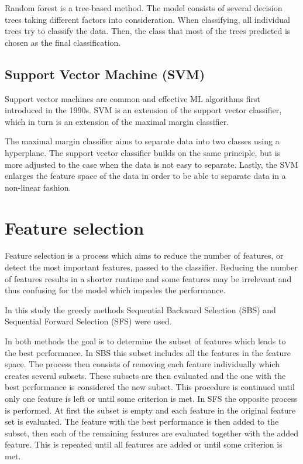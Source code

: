 \documentclass{kththesis}
\begin{document}
Random forest is a tree-based method. The model consists of several decision trees taking different factors into consideration. When classifying, all individual trees try to classify the data. Then, the class that most of the trees predicted is chosen as the final classification. \parencite{ibmrforest}


\subsection{Support Vector Machine (SVM)}

Support vector machines are common and effective ML algorithms first introduced in the 1990s. SVM is an extension of the support vector classifier, which in turn is an extension of the maximal margin classifier.

The maximal margin classifier aims to separate data into two classes using a hyperplane. The support vector classifier builds on the same principle, but is more adjusted to the case when the data is not easy to separate. Lastly, the SVM enlarges the feature space of the data in order to be able to separate data in a non-linear fashion. \parencite{james2013introduction}


\section{Feature selection}


Feature selection is a process which aims to reduce the number of features, or detect the most important features, passed to the classifier. Reducing the number of features results in a shorter runtime and some features may be irrelevant and thus confusing for the model which impedes the performance. \parencite{chaganti2022thyroid}

In this study the greedy methods Sequential Backward Selection (SBS) and Sequential Forward Selection (SFS) were used.

In both methods the goal is to determine the subset of features which leads to the best performance. In SBS this subset includes all the features in the feature space. The process then consists of removing each feature individually which creates several subsets. These subsets are then evaluated and the one with the best performance is considered the new subset. This procedure is continued until only one feature is left or until some criterion is met. In SFS the opposite process is performed. At first the subset is empty and each feature in the original feature set is evaluated. The feature with the best performance is then added to the subset, then each of the remaining features are evaluated together with the added feature. This is repeated until all features are added or until some criterion is met. \parencite{chaganti2022thyroid}
\end{document}
